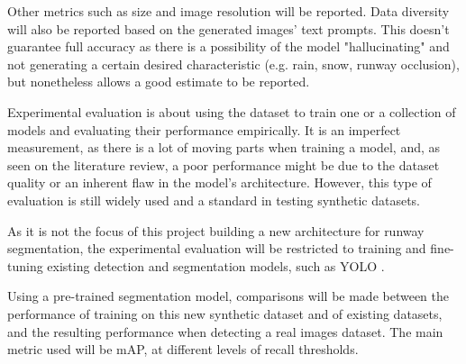 Other metrics such as size and image resolution will be reported. Data diversity will also be reported based on the generated images' text prompts. This doesn't guarantee full accuracy as there is a possibility of the model "hallucinating" and not generating a certain desired characteristic (e.g. rain, snow, runway occlusion), but nonetheless allows a good estimate to be reported.

Experimental evaluation is about using the dataset to train one or a collection of models and evaluating their performance empirically. It is an imperfect measurement, as there is a lot of moving parts when training a model, and, as seen on the literature review, a poor performance might be due to the dataset quality or an inherent flaw in the model's architecture. However, this type of evaluation is still widely used and a standard in testing synthetic datasets.

As it is not the focus of this project building a new architecture for runway
segmentation, the experimental evaluation will be restricted to training and
fine-tuning existing detection and segmentation models, such as YOLO
\cite{jocher_ultralytics_2023}.

Using a pre-trained segmentation model, comparisons will be made between the
performance of training on this new synthetic dataset and of existing datasets,
and the resulting performance when detecting a real images dataset. The main
metric used will be \ac{mAP}, at different levels of recall thresholds.
